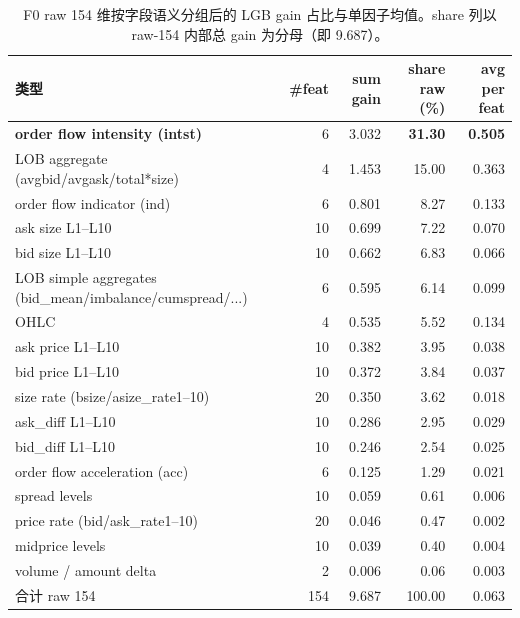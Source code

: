 \documentclass[10.5pt,a4paper]{article}
\begin{document}
\begin{table}[H]
\centering\small
\begin{tabular}{l r r r r}
\toprule
类型 & \#feat & sum gain & share raw (\%) & avg per feat \\
\midrule
\textbf{order flow intensity (intst)}     &  6 & 3.032 & \textbf{31.30} & \textbf{0.505} \\
LOB aggregate (avgbid/avgask/total*size)  &  4 & 1.453 & 15.00 & 0.363 \\
order flow indicator (ind)                &  6 & 0.801 &  8.27 & 0.133 \\
ask size L1–L10                           & 10 & 0.699 &  7.22 & 0.070 \\
bid size L1–L10                           & 10 & 0.662 &  6.83 & 0.066 \\
LOB simple aggregates (bid\_mean/imbalance/cumspread/...) &  6 & 0.595 &  6.14 & 0.099 \\
OHLC                                      &  4 & 0.535 &  5.52 & 0.134 \\
ask price L1–L10                          & 10 & 0.382 &  3.95 & 0.038 \\
bid price L1–L10                          & 10 & 0.372 &  3.84 & 0.037 \\
size rate (bsize/asize\_rate1–10)         & 20 & 0.350 &  3.62 & 0.018 \\
ask\_diff L1–L10                          & 10 & 0.286 &  2.95 & 0.029 \\
bid\_diff L1–L10                          & 10 & 0.246 &  2.54 & 0.025 \\
order flow acceleration (acc)             &  6 & 0.125 &  1.29 & 0.021 \\
spread levels                             & 10 & 0.059 &  0.61 & 0.006 \\
price rate (bid/ask\_rate1–10)            & 20 & 0.046 &  0.47 & 0.002 \\
midprice levels                           & 10 & 0.039 &  0.40 & 0.004 \\
volume / amount delta                     &  2 & 0.006 &  0.06 & 0.003 \\
\midrule
合计 raw 154                              & 154 & 9.687 & 100.00 & 0.063 \\
\bottomrule
\end{tabular}
\caption{F0 raw 154 维按字段语义分组后的 LGB gain 占比与单因子均值。share 列以 raw-154 内部总 gain 为分母（即 9.687）。}
\label{tab:f0-cat}
\end{table}
\end{document}
